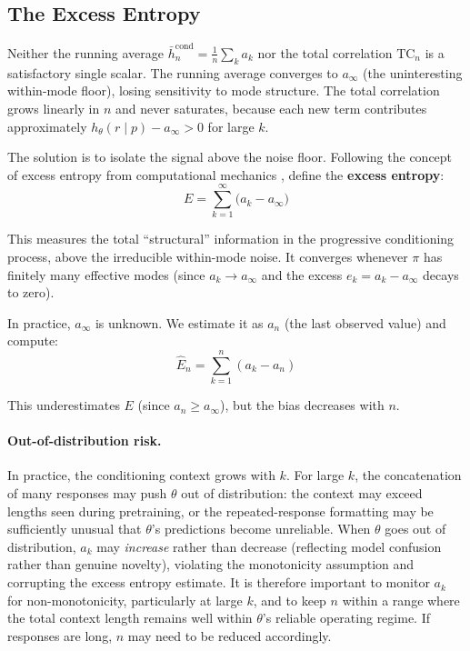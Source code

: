 \documentclass[11pt]{article}
\newcommand{\TC}{\mathrm{TC}}
\begin{document}
\subsection{The Excess Entropy}

Neither the running average $\bar{h}^{\mathrm{cond}}_n = \frac{1}{n}\sum_k a_k$ nor the total correlation $\TC_n$ is a satisfactory single scalar. The running average converges to $a_\infty$ (the uninteresting within-mode floor), losing sensitivity to mode structure. The total correlation grows linearly in $n$ and never saturates, because each new term contributes approximately $h_\theta(r \mid p) - a_\infty > 0$ for large $k$.

The solution is to isolate the signal above the noise floor. Following the concept of excess entropy from computational mechanics \citep{crutchfield2003regularities}, define the \textbf{excess entropy}:
\begin{equation}\label{eq:excess}
    E = \sum_{k=1}^{\infty}\bigl(a_k - a_\infty\bigr)
\end{equation}

This measures the total ``structural'' information in the progressive conditioning process, above the irreducible within-mode noise. It converges whenever $\pi$ has finitely many effective modes (since $a_k \to a_\infty$ and the excess $e_k = a_k - a_\infty$ decays to zero).

In practice, $a_\infty$ is unknown. We estimate it as $a_n$ (the last observed value) and compute:
\begin{equation}\label{eq:excess-hat}
    \hat{E}_n = \sum_{k=1}^{n}(a_k - a_n)
\end{equation}

This underestimates $E$ (since $a_n \geq a_\infty$), but the bias decreases with $n$.

\paragraph{Out-of-distribution risk.} In practice, the conditioning context grows with $k$. For large $k$, the concatenation of many responses may push $\theta$ out of distribution: the context may exceed lengths seen during pretraining, or the repeated-response formatting may be sufficiently unusual that $\theta$'s predictions become unreliable. When $\theta$ goes out of distribution, $a_k$ may \emph{increase} rather than decrease (reflecting model confusion rather than genuine novelty), violating the monotonicity assumption and corrupting the excess entropy estimate. It is therefore important to monitor $a_k$ for non-monotonicity, particularly at large $k$, and to keep $n$ within a range where the total context length remains well within $\theta$'s reliable operating regime. If responses are long, $n$ may need to be reduced accordingly.
\end{document}
